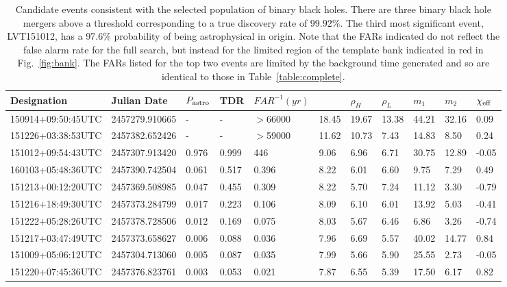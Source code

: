 \newpage
\begin{table}[ht!]
  \begin{center}
    \caption{Candidate events consistent with the selected population of binary black holes. There are three binary black hole mergers above a threshold corresponding to a true discovery rate of $99.92\%$. The third most significant event, LVT151012, has a 97.6\% probability of
    being astrophysical in origin. Note that the FARs indicated do not reflect the false alarm rate for the full search, but instead for the limited region of the template bank indicated in red in Fig.~\ref{fig:bank}. The FARs listed for the top two events are limited
    by the background time generated and so are identical to those in Table~\ref{table:complete}.}
    \label{table:bbh}
  \end{center}
\begin{tabularx}{1.0\textwidth}{lllllllllll}
Designation & Julian Date & $P_{\mathrm{astro}}{}$ & TDR & $FAR^{-1} (yr)$ & \rankingstat{} & $\rho_H$ & $\rho_L$ & $m_1$ & $m_2$ & $\chi_{\mathrm{eff}}{}$ \\ \hline
150914+09:50:45UTC & 2457279.910665 & - & - &  $>$66000 & 18.45 & 19.67 & 13.38 & 44.21 & 32.16 & 0.09\\
151226+03:38:53UTC & 2457382.652426 & - & - &  $>$59000 & 11.62 & 10.73 & 7.43 & 14.83 & 8.50 & 0.24\\
151012+09:54:43UTC & 2457307.913420 & 0.976 & 0.999 &    446 & 9.06 & 6.96 & 6.71 & 30.75 & 12.89 & -0.05\\
160103+05:48:36UTC & 2457390.742504 & 0.061 & 0.517 &      0.396 & 8.22 & 6.01 & 6.60 & 9.75 & 7.29 & 0.49\\
151213+00:12:20UTC & 2457369.508985 & 0.047 & 0.455 &      0.309 & 8.22 & 5.70 & 7.24 & 11.12 & 3.30 & -0.79\\
151216+18:49:30UTC & 2457373.284799 & 0.017 & 0.223 &      0.106 & 8.09 & 6.10 & 6.01 & 13.92 & 5.03 & -0.41\\
151222+05:28:26UTC & 2457378.728506 & 0.012 & 0.169 &      0.075 & 8.03 & 5.67 & 6.46 & 6.86 & 3.26 & -0.74\\
151217+03:47:49UTC & 2457373.658627 & 0.006 & 0.088 &      0.036 & 7.96 & 6.69 & 5.57 & 40.02 & 14.77 & 0.84\\
151009+05:06:12UTC & 2457304.713060 & 0.005 & 0.087 &      0.035 & 7.99 & 5.66 & 5.90 & 25.55 & 2.73 & -0.05\\
151220+07:45:36UTC & 2457376.823761 & 0.003 & 0.053 &      0.021 & 7.87 & 6.55 & 5.39 & 17.50 & 6.17 & 0.82\\

\end{tabularx}
\end{table}
